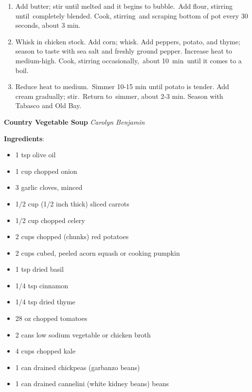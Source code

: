 \documentclass[11pt, twoside, openany]{book}
\begin{document}
\begin{minipage}[t]{\linewidth}
\begin{enumerate}
\item Add butter; stir until melted and it begins to bubble. Add flour, stirring until completely blended. Cook, stirring and scraping bottom of pot every 30 seconds, about 3 min.
\item Whisk in chicken stock. Add corn; whisk. Add peppers, potato, and thyme; season to taste with sea salt and freshly ground pepper. Increase heat to medium-high. Cook, stirring occasionally, about 10 min until it comes to a boil.
\item Reduce heat to medium. Simmer 10-15 min until potato is tender. Add cream gradually; stir. Return to simmer, about 2-3 min. Season with Tabasco and Old Bay.
\end{enumerate}
\end{minipage}\vspace{8mm}
\noindent\begin{minipage}[t]{\linewidth}%
{\Large\textbf{Country Vegetable Soup}} \label{country-vegetable-soup}\hfill\textit{Carolyn Benjamin}\\
\noindent\begin{minipage}[t]{0.78\linewidth}%
\textbf{Ingredients}:\vspace{-3mm}
\begin{multicols}{2}
\begin{itemize}\setlength\itemsep{-1mm}
\item 1 tsp olive oil
\item 1 cup chopped onion
\item 3 garlic cloves, minced
\item 1/2 cup (1/2 inch thick) sliced carrots
\item 1/2 cup chopped celery
\item 2 cups chopped (chunks) red potatoes
\item 2 cups cubed, peeled acorn squash or cooking pumpkin
\item 1 tsp dried basil
\item 1/4 tsp cinnamon
\item 1/4 tsp dried thyme
\item 28 oz chopped tomatoes
\item 2 cans low sodium vegetable or chicken broth
\item 4 cups chopped kale
\item 1 can drained chickpeas (garbanzo beans)
\item 1 can drained cannelini (white kidney beans) beans
\end{itemize}
\end{multicols}

\end{minipage}
\end{minipage}
\end{document}
